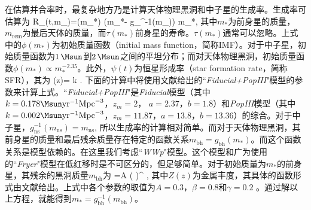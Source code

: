 在估算并合率时，最复杂地方乃是计算天体物理黑洞和中子星的生成率。生成率可估算为\citep{Dvorkin:2016wac}
\e
    R_{}(t,m_{})=\int \psi [t-\tau(m_{*})] \phi(m_{*})
    \delta(m_{*}- g_{}^{-1}(m_{})) m_{*},
\q
其中$m_{*}$为前身星的质量，$m_{\mathrm{rem}}$为最后天体的质量，而$\tau(m_{*})$前身星的寿命。$\tau(m_{*})$通常可以忽略\citep{Schaerer:2001jc}。上式中的$\phi(m_{*})$为初始质量函数（initial mass function，简称IMF）。对于中子星，初始质量函数为$1\,\Msun$到$2\,\Msun$之间的平坦分布；而对天体物理黑洞，初始质量函数$\phi(m_{*}) \propto m_{*}^{-2.35}$。此外，$\psi(t)$为恒星形成率（star formation rate，简称SFR），其为\citep{Nagamine:2003bd}
\e
\psi(z)= k . 
\q
下面的计算中将使用文献\cite{Dvorkin:2016wac}给出的``\textit{Fiducial+PopIII}"模型的参数来计算上式。``\textit{Fiducial+PopIII}"是\textit{Fiducial}模型（其中$k=0.178 \Msun \mathrm{yr}^{-1} \mathrm{Mpc}^{-3}$，$z_{m}=2$， $a=2.37$，$b=1.8$）和\textit{PopIII}模型（其中$k=0.002 \Msun \mathrm{yr}^{-1} \mathrm{Mpc}^{-3}$，$z_{m}=11.87$，$a=13.8$，$b=13.36$）的综合。对于中子星，$g^{-1}_{\mathrm{ns}}(m_{\mathrm{ns}})=m_{\mathrm{ns}}$, 所以生成率的计算相对简单。而对于天体物理黑洞，其前身星的质量和最后残余质量存在特定的函数关系$m_{\mathrm{bh}}=g_{\mathrm{bh}}(m_{*})$。而这个函数关系是模型依赖的。在这里我们考虑``\textit{WWp}"模型\citep{Woosley:1995ip}。这个模型和广为使用的``\textit{Fryer}"模型\citep{Dvorkin:2016wac}在低红移时是不可区分的，但足够简单。对于初始质量为$m_{*}$的前身星，其残余的黑洞质量$m_{\mathrm{bh}}$为
\e
{}=A \left( \right)^{\beta} ,
\q
其中$Z(z)$为金属丰度，其具体的函数形式由文献\cite{Belczynski:2016obo}给出。上式中各个参数的取值为$A=0.3$，$\beta =0.8$和$\gamma =0.2$ \citep{Dvorkin:2016wac}。通过解以上方程，就能得到$m_{*} = g_{\mathrm{bh}}^{-1}(m_{\mathrm{bh}})$。

